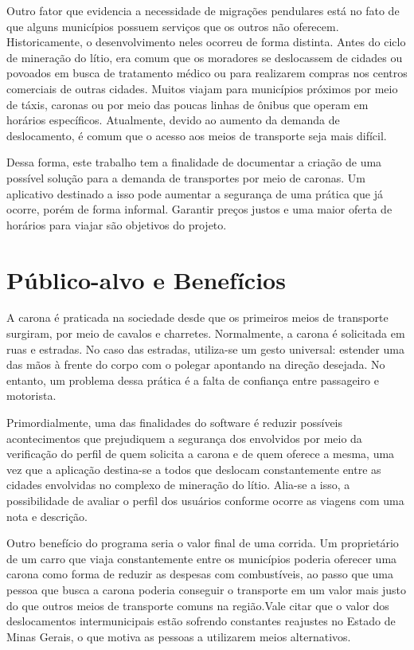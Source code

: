 Outro fator que evidencia a necessidade de migrações pendulares está no fato de que alguns municípios possuem serviços que os outros não oferecem. Historicamente, o desenvolvimento neles ocorreu de forma distinta. Antes do ciclo de mineração do lítio, era comum que os moradores se deslocassem de cidades ou povoados em busca de tratamento médico ou para realizarem compras nos centros comerciais de outras cidades. Muitos viajam para municípios próximos por meio de táxis, caronas ou por meio das poucas linhas de ônibus que operam em horários específicos. Atualmente, devido ao aumento da demanda de deslocamento, é comum que o acesso aos meios de transporte seja mais difícil. 

Dessa forma, este trabalho tem a finalidade de documentar a criação de uma possível solução para a demanda de transportes por meio de caronas. Um aplicativo destinado a isso pode aumentar a segurança de uma prática que já ocorre, porém de forma informal. Garantir preços justos e uma maior oferta de horários para viajar são objetivos do projeto.

\section{Público-alvo e Benefícios}


A carona é praticada na sociedade desde que os primeiros meios de transporte surgiram, por meio de cavalos e charretes. Normalmente, a carona é solicitada em ruas e estradas. No caso das estradas, utiliza-se um gesto universal: estender uma das mãos à frente do corpo com o polegar apontando na direção desejada. No entanto, um problema dessa prática é a falta de confiança entre passageiro e motorista.

Primordialmente, uma das finalidades do software é reduzir possíveis acontecimentos que prejudiquem a segurança dos envolvidos por meio da verificação do perfil de quem solicita a carona e de quem oferece a mesma, uma vez que a aplicação destina-se a todos que deslocam constantemente entre as cidades envolvidas no complexo de mineração do lítio. Alia-se a isso, a possibilidade de avaliar o perfil dos usuários conforme ocorre as viagens com uma nota e descrição. 

Outro benefício do programa seria o valor final de uma corrida. Um proprietário de um carro que viaja constantemente entre os municípios poderia oferecer uma carona como forma de reduzir as despesas com combustíveis, ao passo que uma pessoa que busca a carona poderia conseguir o transporte em um valor mais justo do que outros meios de transporte comuns na região.Vale citar que o valor dos deslocamentos intermunicipais estão sofrendo constantes reajustes no Estado de Minas Gerais, o que motiva as pessoas a utilizarem meios alternativos. 

